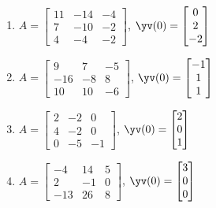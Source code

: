 \begin{exercise}
\begin{enumerate}
\item \(A=\begin{bmatrix} 11 & -14 & -4
\\7 & -10 & -2
\\4 & -4 & -2 \end{bmatrix}\), 
\(\yv(0)=\begin{bmatrix} 0
\\2
\\-2 \end{bmatrix}\)

\item \(A=\begin{bmatrix} 9 & 7 & -5
\\-16 & -8 & 8
\\10 & 10 & -6 \end{bmatrix}\), 
\(\yv(0)=\begin{bmatrix} -1
\\1
\\1 \end{bmatrix}\)

\item \(A=\begin{bmatrix} 2 & -2 & 0
\\4 & -2 & 0
\\0 & -5 & -1 \end{bmatrix}\), 
\(\yv(0)=\begin{bmatrix} 2
\\0
\\1 \end{bmatrix}\)

\item \(A=\begin{bmatrix} -4 & 14 & 5
\\2 & -1 & 0
\\-13 & 26 & 8 \end{bmatrix}\), 
\(\yv(0)=\begin{bmatrix} 3
\\0
\\0 \end{bmatrix}\)


\end{enumerate}
\end{exercise}







